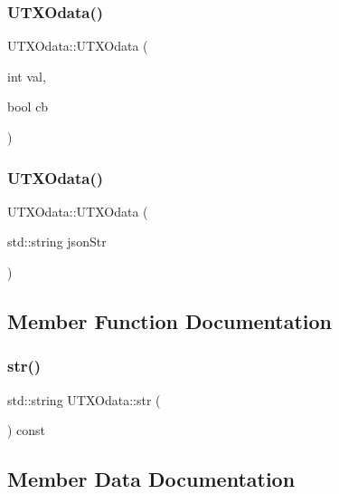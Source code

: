 \subsubsection{\texorpdfstring{U\+T\+X\+Odata()}{UTXOdata()}\hspace{0.1cm}{\footnotesize\ttfamily [1/2]}}
{\footnotesize\ttfamily U\+T\+X\+Odata\+::\+U\+T\+X\+Odata (\begin{DoxyParamCaption}\item[{int}]{val,  }\item[{bool}]{cb }\end{DoxyParamCaption})}

\mbox{\label{structUTXOdata_a0f569e3b932610a822140104fdd418a9}} 
\subsubsection{\texorpdfstring{U\+T\+X\+Odata()}{UTXOdata()}\hspace{0.1cm}{\footnotesize\ttfamily [2/2]}}
{\footnotesize\ttfamily U\+T\+X\+Odata\+::\+U\+T\+X\+Odata (\begin{DoxyParamCaption}\item[{std\+::string}]{json\+Str }\end{DoxyParamCaption})\hspace{0.3cm}{\ttfamily [explicit]}}



\subsection{Member Function Documentation}
\mbox{\label{structUTXOdata_a8416d6a4cc715159a8e2f9da47b5519a}} 
\subsubsection{\texorpdfstring{str()}{str()}}
{\footnotesize\ttfamily std\+::string U\+T\+X\+Odata\+::str (\begin{DoxyParamCaption}{ }\end{DoxyParamCaption}) const}



\subsection{Member Data Documentation}
\mbox{\label{structUTXOdata_aec980c11dde6738bf2120fb3bd3e541f}} 
